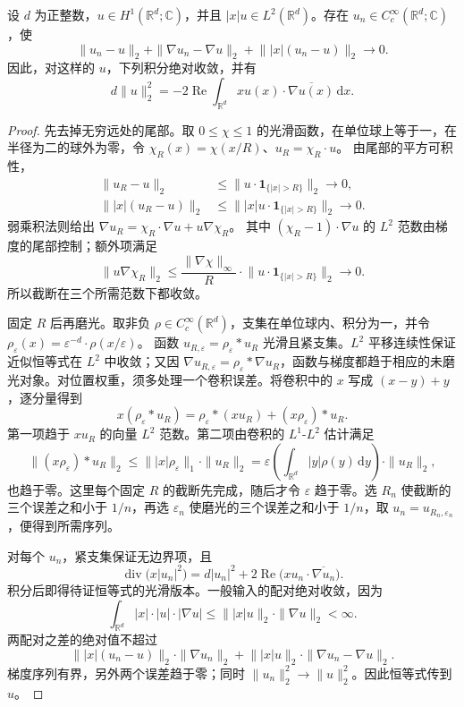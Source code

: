 \begin{lemma}[位置权重与弱梯度的同时逼近]\label{b2:lem:20-weighted-smooth-density}
设 \(d\) 为正整数，\(u\in H^1(\mathbb R^d;\mathbb C)\)，并且 \(|x|u\in L^2(\mathbb R^d)\)。存在 \(u_n\in C_c^\infty(\mathbb R^d;\mathbb C)\)，使
\[
 \|u_n-u\|_2+
 \|\nabla u_n-\nabla u\|_2+
 \bigl\||x|(u_n-u)\bigr\|_2\longrightarrow0.
\]
因此，对这样的 \(u\)，下列积分绝对收敛，并有
\[
 d\|u\|_2^2
 =-2\operatorname{Re}\int_{\mathbb R^d}
       x u(x)\cdot\overline{\nabla u(x)}\,\mathrm dx.
\]
\end{lemma}
\begin{proof}
先去掉无穷远处的尾部。取 \(0\leq\chi\leq1\) 的光滑函数，在单位球上等于一，在半径为二的球外为零，令
\(\chi_R(x)=\chi(x/R)\)、\(u_R=\chi_R\cdot u\)。
由尾部的平方可积性，
\[
 \begin{aligned}
 \|u_R-u\|_2
 &\leq\bigl\|u\cdot\mathbf1_{\{|x|>R\}}\bigr\|_2
   \longrightarrow0,\\
 \bigl\||x|(u_R-u)\bigr\|_2
 &\leq\bigl\||x|u\cdot\mathbf1_{\{|x|>R\}}\bigr\|_2
   \longrightarrow0.
 \end{aligned}
\]
弱乘积法则给出
\(\nabla u_R=\chi_R\cdot\nabla u+u\nabla\chi_R\)。
其中 \((\chi_R-1)\cdot\nabla u\) 的 \(L^2\) 范数由梯度的尾部控制；额外项满足
\[
 \|u\nabla\chi_R\|_2
 \leq\frac{\|\nabla\chi\|_\infty}{R}
       \cdot\bigl\|u\cdot\mathbf1_{\{|x|>R\}}\bigr\|_2
 \longrightarrow0.
\]
所以截断在三个所需范数下都收敛。

固定 \(R\) 后再磨光。取非负 \(\rho\in C_c^\infty(\mathbb R^d)\)，支集在单位球内、积分为一，并令
\(\rho_\varepsilon(x)=\varepsilon^{-d}\cdot\rho(x/\varepsilon)\)。
函数 \(u_{R,\varepsilon}=\rho_\varepsilon*u_R\) 光滑且紧支集。\(L^2\) 平移连续性保证近似恒等式在 \(L^2\) 中收敛；又因
\(\nabla u_{R,\varepsilon}=\rho_\varepsilon*\nabla u_R\)，函数与梯度都趋于相应的未磨光对象。对位置权重，须多处理一个卷积误差。将卷积中的 \(x\) 写成 \((x-y)+y\)，逐分量得到
\[
 x(\rho_\varepsilon*u_R)
 =\rho_\varepsilon*(x u_R)+(x\rho_\varepsilon)*u_R.
\]
第一项趋于 \(x u_R\) 的向量 \(L^2\) 范数。第二项由卷积的 \(L^1\)-\(L^2\) 估计满足
\[
 \bigl\|(x\rho_\varepsilon)*u_R\bigr\|_2
 \leq\bigl\||x|\rho_\varepsilon\bigr\|_1\cdot\|u_R\|_2
 =\varepsilon\left(\int_{\mathbb R^d}|y|\rho(y)\,\mathrm dy\right)
       \cdot\|u_R\|_2,
\]
也趋于零。这里每个固定 \(R\) 的截断先完成，随后才令 \(\varepsilon\) 趋于零。选 \(R_n\) 使截断的三个误差之和小于 \(1/n\)，再选 \(\varepsilon_n\) 使磨光的三个误差之和小于 \(1/n\)，取 \(u_n=u_{R_n,\varepsilon_n}\)，便得到所需序列。

对每个 \(u_n\)，紧支集保证无边界项，且
\[
 \operatorname{div}\bigl(x|u_n|^2\bigr)
 =d|u_n|^2+
   2\operatorname{Re}\bigl(xu_n\cdot\overline{\nabla u_n}\bigr).
\]
积分后即得待证恒等式的光滑版本。一般输入的配对绝对收敛，因为
\[
 \int_{\mathbb R^d}|x|\cdot|u|\cdot|\nabla u|
 \leq\bigl\||x|u\bigr\|_2\cdot\|\nabla u\|_2<\infty.
\]
两配对之差的绝对值不超过
\[
 \bigl\||x|(u_n-u)\bigr\|_2\cdot\|\nabla u_n\|_2
 +\bigl\||x|u\bigr\|_2\cdot\|\nabla u_n-\nabla u\|_2.
\]
梯度序列有界，另外两个误差趋于零；同时 \(\|u_n\|_2^2\to\|u\|_2^2\)。因此恒等式传到 \(u\)。
\end{proof}

